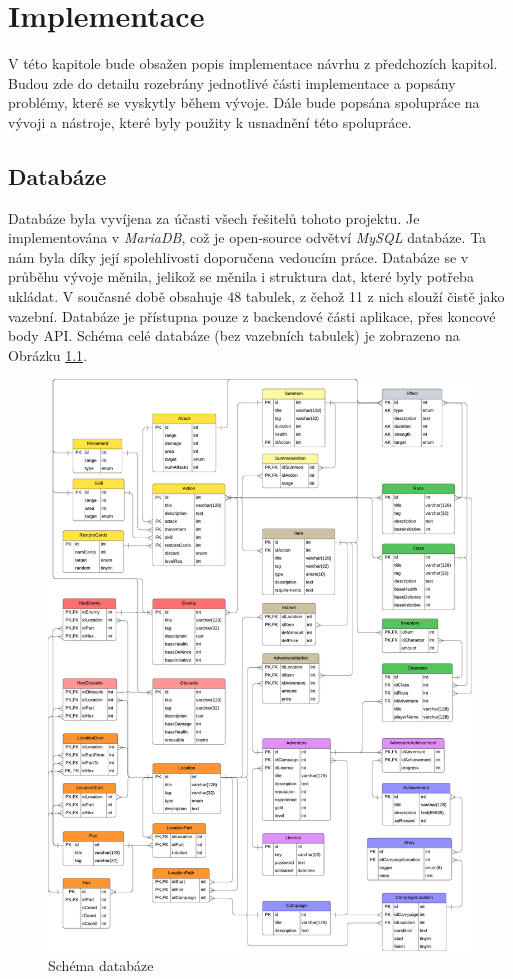 \chapter{Implementace}
V této kapitole bude obsažen popis implementace návrhu z předchozích kapitol. Budou zde do detailu rozebrány jednotlivé části implementace a popsány problémy, které se vyskytly během vývoje. Dále bude popsána spolupráce na vývoji a nástroje, které byly použity k usnadnění této spolupráce.

\section{Databáze}
Databáze byla vyvíjena za účasti všech řešitelů tohoto projektu. Je implementována v \textit{MariaDB}, což je open-source odvětví \textit{MySQL} databáze. Ta nám byla díky její spolehlivosti doporučena vedoucím práce. Databáze se v průběhu vývoje měnila, jelikož se měnila i struktura dat, které byly potřeba ukládat. V současné době obsahuje 48 tabulek, z čehož 11 z nich slouží čistě jako vazební. Databáze je přístupna pouze z backendové části aplikace, přes koncové body API. Schéma celé databáze (bez vazebních tabulek) je zobrazeno na Obrázku \ref{fig:db_schema}.

\begin{figure}[htbp]
  \centering
  \includegraphics[width=.95\textwidth]{../../shared/diagrams/dbScheme.pdf}
  \caption{Schéma databáze}
  \label{fig:db_schema}
\end{figure}

